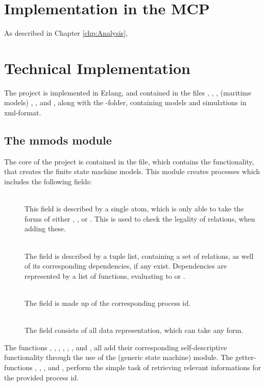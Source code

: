 \section{Implementation in the MCP}
As described in Chapter \ref{chp:Analysis}, 

\section{Technical Implementation}
The project is implemented in Erlang, and contained in the files , , , (maritime models) , , and , along with the -folder, containing models and simulations in xml-format.

\subsection{The mmods module}
The core of the project is contained in the  file, which contains the functionality, that creates the finite state machine models. This module creates processes which includes the following fields:
\begin{description}
	\item[]\ \\
		This field is described by a single atom, which is only able to take the forms of either , , or . This is used to check the legality of relations, when adding these.
	\item[]\ \\
		The  field is described by a tuple list, containing a set of relations, as well of its corresponding dependencies, if any exist. Dependencies are represented by a list of functions, evaluating to  or .
	\item[]\ \\
		The  field is made up of the corresponding process id.
	\item[]\ \\
		The  field consists of all data representation, which can take any form.
\end{description}
The functions , , , , , , and , all add their corresponding self-descriptive functionality through the use of the  (generic state machine) module. The getter-functions , , , and , perform the simple task of retrieving relevant informations for the provided process id.
